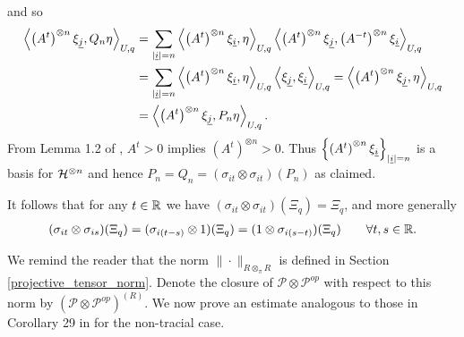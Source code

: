 and so
	\begin{align*}
		\left\langle\left(A^{t}\right)^{\otimes n}\xi_{\underline{j}}, Q_n\eta\right\rangle_{U,q} &= \sum_{|\underline{i}|=n} \left\langle \left(A^{t}\right)^{\otimes n}\xi_{\underline{i}},\eta\right\rangle_{U,q} \left\langle \left(A^{t}\right)^{\otimes n}\xi_{\underline{j}}, \left(A^{-t}\right)^{\otimes n}\xi_{\underline{i}}\right\rangle_{U,q}\\
					&=\sum_{|\underline{i}|=n} \left\langle \left(A^{t}\right)^{\otimes n}\xi_{\underline{i}},\eta\right\rangle_{U,q} \left\langle\xi_{\underline{j}}, \xi_{\underline{i}}\right\rangle_{U,q} = \left\langle \left(A^{t}\right)^{\otimes n}\xi_{\underline{j}},\eta\right\rangle_{U,q}\\
					&=\left\langle \left(A^{t}\right)^{\otimes n}\xi_{\underline{j}},P_n\eta\right\rangle_{U,q}.
	\end{align*}
From Lemma 1.2 of \cite{Hia03}, $A^t>0$ implies $\left(A^t\right)^{\otimes n}>0$. Thus $\left\{ \left(A^{t}\right)^{\otimes n}\xi_{\underline{i}}\right\}_{|\underline{i}|=n}$ is a basis for $\mathcal H^{\otimes n}$ and hence $P_n=Q_n=(\sigma_{it}\otimes \sigma_{it})(P_n)$ as claimed.\par
It follows that for any $t\in\mathbb{R}$ we have $(\sigma_{it}\otimes\sigma_{it})(\Xi_q)=\Xi_q$, and more generally 
	\begin{align}\label{Xi_q_sigma_invariant}
		(\sigma_{it}\otimes\sigma_{is})(\Xi_q)=(\sigma_{i(t-s)}\otimes 1)(\Xi_q)=(1\otimes\sigma_{i(s-t)})(\Xi_q)\qquad \forall t,s\in\mathbb{R}.
	\end{align}\par
We remind the reader that the norm $\|\cdot\|_{R\otimes_\pi R}$ is defined in Section \ref{projective_tensor_norm}. Denote the closure of $\mathscr{P}\otimes\mathscr{P}^{op}$ with respect to this norm by $\left(\mathscr{P}\otimes\mathscr{P}^{op}\right)^{(R)}$. We now prove an estimate analogous to those in Corollary 29 in \cite{D} for the non-tracial case.

